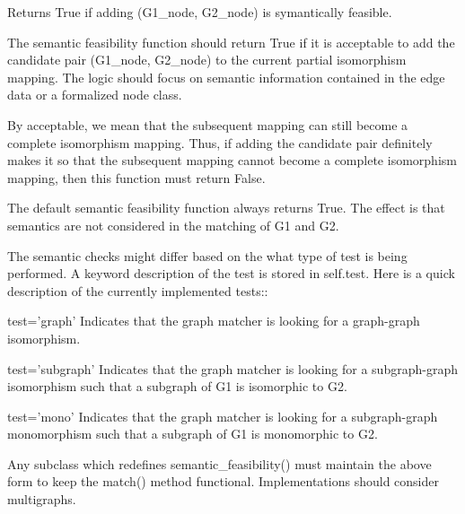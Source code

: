 \begin{DoxyVerb}Returns True if adding (G1_node, G2_node) is symantically feasible.

The semantic feasibility function should return True if it is
acceptable to add the candidate pair (G1_node, G2_node) to the current
partial isomorphism mapping.   The logic should focus on semantic
information contained in the edge data or a formalized node class.

By acceptable, we mean that the subsequent mapping can still become a
complete isomorphism mapping.  Thus, if adding the candidate pair
definitely makes it so that the subsequent mapping cannot become a
complete isomorphism mapping, then this function must return False.

The default semantic feasibility function always returns True. The
effect is that semantics are not considered in the matching of G1
and G2.

The semantic checks might differ based on the what type of test is
being performed.  A keyword description of the test is stored in
self.test.  Here is a quick description of the currently implemented
tests::

  test='graph'
    Indicates that the graph matcher is looking for a graph-graph
    isomorphism.

  test='subgraph'
    Indicates that the graph matcher is looking for a subgraph-graph
    isomorphism such that a subgraph of G1 is isomorphic to G2.

  test='mono'
    Indicates that the graph matcher is looking for a subgraph-graph
    monomorphism such that a subgraph of G1 is monomorphic to G2.

Any subclass which redefines semantic_feasibility() must maintain
the above form to keep the match() method functional. Implementations
should consider multigraphs.
\end{DoxyVerb}
 \mbox{\label{classnetworkx_1_1algorithms_1_1isomorphism_1_1isomorphvf2_1_1GraphMatcher_a8d4981050a5a6e30087630ed4fd50961}} 
